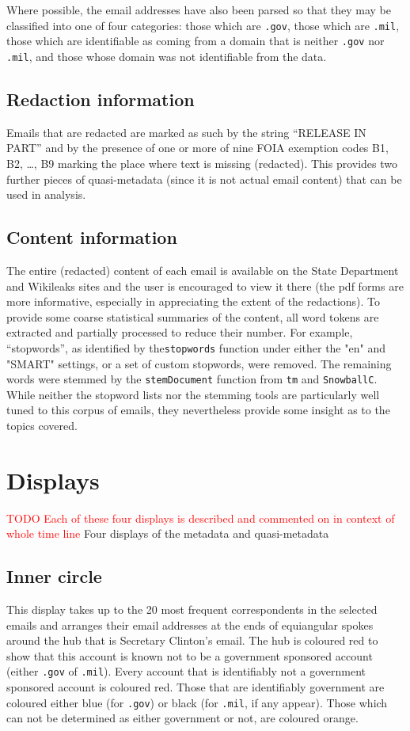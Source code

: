 \documentclass[journal]{vgtc}                %
\newcommand*{\TODO}[1]{\textcolor{red}{TODO #1}}
\begin{document}
Where possible, the email addresses have also been parsed so that they may be classified into one of four categories: those which are \texttt{.gov},  those which are \texttt{.mil},  those which are identifiable as coming from a domain that is neither  \texttt{.gov} nor  \texttt{.mil}, and those whose domain was not identifiable from the data.
\subsection{Redaction information}
\label{sect:data:redact}
Emails that are redacted are marked as such by the string ``RELEASE IN PART'' and by the presence of one or more of nine FOIA exemption codes B1, B2, \ldots, B9  marking the place where text is missing (redacted).  This provides two further pieces of quasi-metadata (since it is not actual email content) that can be used in analysis.
\subsection{Content information}
\label{sect:data:contentinfo}
The entire (redacted) content of each email is available on the State Department and Wikileaks sites and the user is encouraged to view it there (the pdf forms are more informative, especially in appreciating the extent of the redactions).  To provide some coarse statistical summaries of the content, all word tokens are extracted and partially processed to reduce their number.  For example,  ``stopwords'', as identified by the\texttt{stopwords} function under either the "en" and "SMART" settings, or a set of custom stopwords, were removed. The remaining words were stemmed by the \texttt{stemDocument} function from \texttt{tm} and \texttt{SnowballC}.   While neither the stopword lists nor the stemming tools are particularly well tuned to this corpus of emails, they nevertheless provide some insight as to the topics covered.  

\section{Displays}
\label{sect:Displays}
\TODO{Each of these four displays is described and commented on in context of whole time line}
Four displays of the metadata and quasi-metadata 

\subsection{Inner circle}
\label{sect:Displays:circle} 
This display takes up to the 20 most frequent correspondents in the selected emails and arranges their email addresses  at the ends of  equiangular spokes around the hub that is Secretary Clinton's email.  The hub is coloured red to show that this account is known not to be a government sponsored account (either \texttt{.gov} of \texttt{.mil}).  Every account that is identifiably not a government sponsored account is coloured red.  Those that are identifiably government are coloured either blue (for \texttt{.gov}) or black (for \texttt{.mil}, if any appear).  Those which can not be determined as either government or not, are coloured orange.
\end{document}
